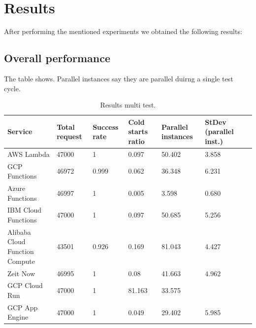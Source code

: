 \documentclass[11pt]{article}
\begin{document}
 




\section{Results}
After performing the mentioned experiments we obtained the following results:



\subsection{Overall performance}

The table shows. Parallel instances say they are parallel duirng a single test cycle.


\begin{table}
\centering
 \begin{tabularx}{1\textwidth}{p{4cm} X X X X X X}
 \textbf{Service} & \textbf{Total request} & \textbf{Success rate} & \textbf{Cold starts ratio} & \textbf{Parallel instances} & \textbf{StDev (parallel inst.)} \\
 \hline
 \hline
 AWS Lambda & 47000 & 1 & 0.097 & 50.402 & 3.858\\
 \hline
 GCP Functions & 46972 & 0.999 & 0.062 & 36.348 & 6.231\\
 \hline
 Azure Functions & 46997 & 1 & 0.005 & 3.598 & 0.680\\
 \hline
 IBM Cloud Functions & 47000 & 1 & 0.097 & 50.685 & 5.256\\
 \hline
 Alibaba Cloud Function Compute & 43501 & 0.926 & 0.169 & 81.043 & 4.427\\
 \hline
 Zeit Now & 46995  & 1 & 0.08 & 41.663 & 4.962\\
 \hline
 GCP Cloud Run & 47000 & 1 & 81.163 & 33.575\\
 \hline
 GCP App Engine & 47000 & 1 & 0.049 & 29.402 & 5.985\\
 \hline

\end{tabularx}
\caption{Results multi test.}
\label{Tab:multi}
\end{table}
\end{document}
